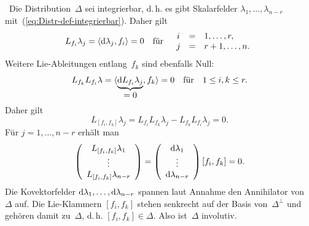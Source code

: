 \begin{svmultproof2}
\notwendig\ Die Distribution~$\Delta$ sei integrierbar, d.\,h.
es gibt Skalarfelder $\lambda_{1},\ldots,\lambda_{n-r}$ mit~(\ref{eq:Distr-def-integrierbar}).
Daher gilt 
\[
L_{f_{i}}\lambda_{j}=\left\langle {\mathrm{d}}\lambda_{j},f_{i}\right\rangle =0\quad\mbox{für}\quad\begin{array}{ccl}
i & = & 1,\ldots,r,\\
j & = & r+1,\ldots,n.
\end{array}
\]
Weitere Lie-Ableitungen entlang~$f_{k}$ sind ebenfalls Null: 
\[
L_{f_{k}}L_{f_{i}}\lambda=\langle\underbrace{{\mathrm{d}} L_{f_{i}}\lambda_{j}}_{{\displaystyle =0}},f_{k}\rangle=0\quad\mbox{für}\quad1\leq i,k\leq r.
\]
Daher gilt 
\[
L_{[f_{i},f_{k}]}\lambda_{j}=L_{f_{i}}L_{f_{k}}\lambda_{j}-L_{f_{k}}L_{f_{i}}\lambda_{j}=0.
\]
Für $j=1,\ldots,n-r$ erhält man 
\[
\left(\begin{array}{c}
L_{[f_{i},f_{k}]}\lambda_{1}\\
\vdots\\
L_{[f_{i},f_{k}]}\lambda_{n-r}
\end{array}\right)=\left(\begin{array}{c}
{\mathrm{d}}\lambda_{1}\\
\vdots\\
{\mathrm{d}}\lambda_{n-r}
\end{array}\right)[f_{i},f_{k}]=0.
\]
Die Kovektorfelder ${\mathrm{d}}\lambda_{1},\ldots,{\mathrm{d}}\lambda_{n-r}$ spannen
laut Annahme den Annihilator von~$\Delta$ auf. Die Lie-Klammern
$[f_{i},f_{k}]$ stehen senkrecht auf der Basis von~$\Delta^{\perp}$
und gehören damit zu~$\Delta$, d.\,h. $[f_{i},f_{k}]\in\Delta$.
Also ist~$\Delta$ involutiv.
\end{svmultproof2}

